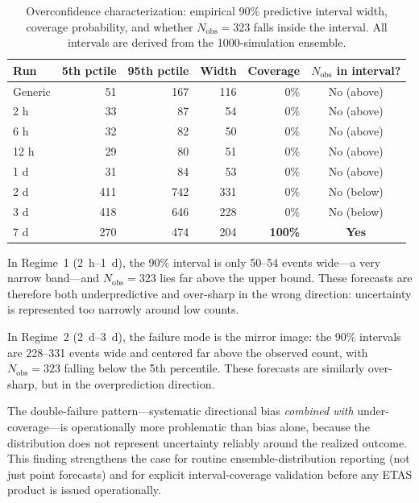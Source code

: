 \documentclass[12pt,letterpaper]{article}
\begin{document}
\begin{table}[ht]
\centering
\small
\caption{Overconfidence characterization: empirical 90\% predictive interval width,
coverage probability, and whether $N_{\mathrm{obs}}=323$ falls inside the interval.
All intervals are derived from the 1000-simulation ensemble.}
\label{tab:overconf}
\begin{tabular}{lrrrrc}
\toprule
Run & 5th pctile & 95th pctile & Width & Coverage & $N_{\mathrm{obs}}$ in interval? \\
\midrule
Generic      & 51  & 167 & 116 & 0\% & No (above) \\
2 h          & 33  & 87  & 54  & 0\% & No (above) \\
6 h          & 32  & 82  & 50  & 0\% & No (above) \\
12 h         & 29  & 80  & 51  & 0\% & No (above) \\
1 d          & 31  & 84  & 53  & 0\% & No (above) \\
2 d          & 411 & 742 & 331 & 0\% & No (below) \\
3 d          & 418 & 646 & 228 & 0\% & No (below) \\
7 d          & 270 & 474 & 204 & \textbf{100\%} & \textbf{Yes} \\
\bottomrule
\end{tabular}
\end{table}

In Regime~1 (2~h--1~d), the 90\% interval is only 50--54 events wide---a very
narrow band---and $N_{\mathrm{obs}}=323$ lies far above the upper bound.
These forecasts are therefore both underpredictive and over-sharp in the wrong
direction: uncertainty is represented too narrowly around low counts.

In Regime~2 (2~d--3~d), the failure mode is the mirror image: the 90\%
intervals are 228--331 events wide and centered far above the observed count,
with $N_{\mathrm{obs}}=323$ falling below the 5th percentile. These forecasts
are similarly over-sharp, but in the overprediction direction.

The double-failure pattern---systematic directional bias \emph{combined with}
under-coverage---is operationally more problematic than bias alone, because
the distribution does not represent uncertainty reliably around the realized
outcome. This finding strengthens the case for routine
ensemble-distribution reporting (not just point forecasts) and for explicit
interval-coverage validation before any ETAS product is issued operationally.
\end{document}
